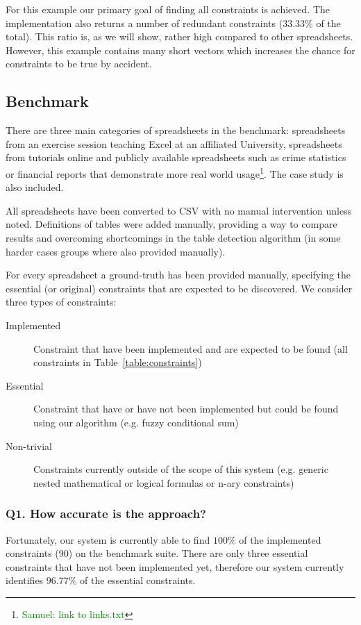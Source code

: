 \documentclass{ecai}
\newcommand{\samuel}[1]{\textcolor{green}{{\sc Samuel:} #1}\xspace}
\begin{document}
For this example our primary goal of finding all constraints is achieved.
The implementation also returns a number of redundant constraints ($33.33\%$ of the total).
This ratio is, as we will show, rather high compared to other spreadsheets.
However, this example contains many short vectors which increases the chance for constraints to be true by accident.

\subsection{Benchmark}
There are three main categories of spreadsheets in the benchmark: spreadsheets from an exercise session teaching Excel at an affiliated University, spreadsheets from tutorials online and publicly available spreadsheets such as crime statistics or financial reports that demonstrate more real world usage\footnote{\samuel{link to links.txt}}.
The case study is also included.

All spreadsheets have been converted to CSV with no manual intervention unless noted.
Definitions of tables were added manually, providing a way to compare results and overcoming shortcomings in the table detection algorithm (in some harder cases groups where also provided manually).

For every spreadsheet a ground-truth has been provided manually, specifying the essential (or original) constraints that are expected to be discovered.
We consider three types of constraints:
\begin{description}
  \item[Implemented] Constraint that have been implemented and are expected to be found (all constraints in Table~\ref{table:constraints})
  \item[Essential] Constraint that have or have not been implemented but could be found using our algorithm (e.g. fuzzy conditional sum)
  \item[Non-trivial] Constraints currently outside of the scope of this system (e.g. generic nested mathematical or logical formulas or n-ary constraints)
\end{description}

\subsubsection*{Q1. How accurate is the approach?}
Fortunately, our system is currently able to find $100\%$ of the implemented constraints (90) on the benchmark suite.
There are only three essential constraints that have not been implemented yet, therefore our system currently identifies $96.77\%$ of the essential constraints.
\end{document}
